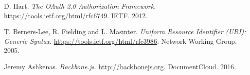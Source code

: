 \begin{thebibliography}{9}

  D. Hart.
  \emph{The OAuth 2.0 Authorization Framework}.
  \url{https://tools.ietf.org/html/rfc6749}.
  IETF.
  2012.
 
	T. Berners-Lee, R. Fielding and L. Masinter.
	\emph{Uniform Resource Identifier (URI): Generic Syntax}.
	\url{https://tools.ietf.org/html/rfc3986}.
	Network Working Group.
	2005.

	Jeremy Ashkenas.
	\emph{Backbone.js}.
	\url{http://backbonejs.org}.
	DocumentCloud.
	2016.

\end{thebibliography}